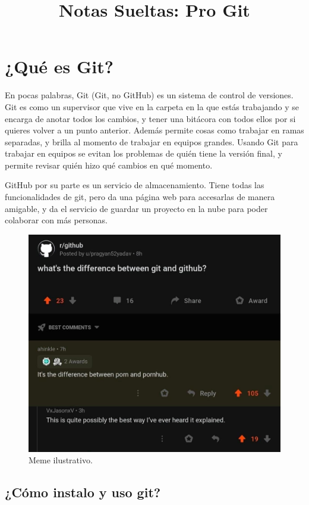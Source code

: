 \documentclass[spanish, 12pt, a4paper]{article}
\title{Notas Sueltas: Pro Git}
\begin{document}
\section{¿Qué es Git?}

En pocas palabras, Git (Git, no GitHub) es un sistema de control de
versiones. Git es como un supervisor que vive en la carpeta en la que
estás trabajando y se encarga de anotar todos los cambios, y tener una
bitácora con todos ellos por si quieres volver a un punto anterior.
Además permite cosas como trabajar en ramas separadas, y brilla al
momento de trabajar en equipos grandes. Usando Git para trabajar en
equipos se evitan los problemas de quién tiene la versión final, y
permite revisar quién hizo qué cambios en qué momento.

GitHub por su parte es un servicio de almacenamiento. Tiene todas las
funcionalidades de git, pero da una página web para accesarlas de manera
amigable, y da el servicio de guardar un proyecto en la nube para poder
colaborar con más personas.

\begin{figure}
\centering
\includegraphics{figs/meme_git_v_gh.jpg}
\caption{Meme ilustrativo.{}}
\end{figure}

\subsection{¿Cómo instalo y uso git?}
\end{document}
